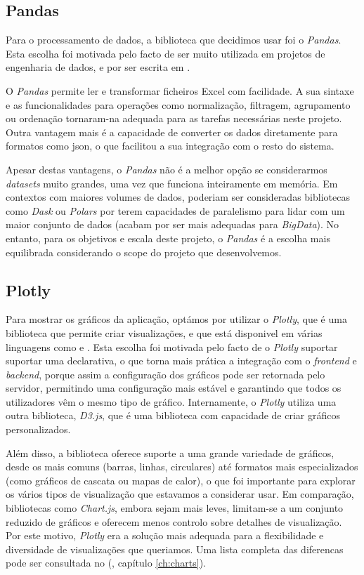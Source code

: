 \subsection{Pandas}

Para o processamento de dados, a biblioteca que decidimos usar foi o \textit{Pandas}. Esta escolha foi motivada pelo facto de ser muito utilizada em projetos de engenharia de dados, e por ser escrita em .

O \textit{Pandas} permite ler e transformar ficheiros Excel com facilidade. A sua sintaxe e as funcionalidades para operações como normalização, filtragem, agrupamento ou ordenação tornaram-na adequada para as tarefas necessárias neste projeto.  Outra vantagem mais é a capacidade de converter os dados diretamente para formatos como \gls{json}, o que facilitou a sua integração com o resto do sistema.

Apesar destas vantagens, o \textit{Pandas} não é a melhor opção se considerarmos \textit{datasets} muito grandes, uma vez que funciona inteiramente em memória. Em contextos com maiores volumes de dados, poderiam ser consideradas bibliotecas como \textit{Dask} ou \textit{Polars} por terem capacidades de paralelismo para lidar com um maior conjunto de dados (acabam por ser mais adequadas para \textit{BigData}). No entanto, para os objetivos e escala deste projeto, o \textit{Pandas} é a escolha mais equilibrada considerando o scope do projeto que desenvolvemos.

\subsection{Plotly}

Para mostrar os gráficos da aplicação, optámos por utilizar o \textit{Plotly}, que é uma biblioteca  que permite criar visualizações, e que está disponivel em várias linguagens como  e . Esta escolha foi motivada pelo facto de o \textit{Plotly} suportar suportar uma  declarativa, o que torna mais prática a integração com o \textit{frontend} e \textit{backend}, porque assim a configuração dos gráficos pode ser retornada pelo servidor, permitindo uma configuração mais estável e garantindo que todos os utilizadores vêm o mesmo tipo de gráfico. Internamente, o \textit{Plotly} utiliza uma outra biblioteca, \textit{D3.js}, que é uma biblioteca com capacidade de criar gráficos personalizados.

Além disso, a biblioteca oferece suporte a uma grande variedade de gráficos, desde os mais comuns (barras, linhas, circulares) até formatos mais especializados (como gráficos de cascata ou mapas de calor), o que foi importante para explorar os vários tipos de visualização que estavamos a considerar usar. Em comparação, bibliotecas como \textit{Chart.js}, embora sejam mais leves, limitam-se a um conjunto reduzido de gráficos e oferecem menos controlo sobre detalhes de visualização. Por este motivo, \textit{Plotly} era a solução mais adequada para a flexibilidade e diversidade de visualizações que queriamos. Uma lista completa das diferencas pode ser consultada no (\cf, capítulo \ref{ch:charts}).

